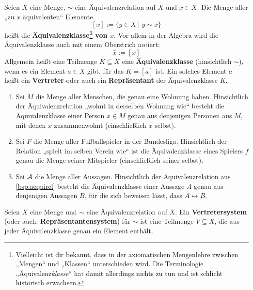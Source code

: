 \begin{defin}[Äquivalenzklasse] \label{def:aequiklasse}   
    Seien $X$ eine Menge, $\sim$ eine Äquivalenzrelation auf $X$ und $x\in X$. Die Menge aller „zu $x$ äquivalenten“ Elemente
        \[ [x] := \{ y\in X \mid y\sim x \}\]
    heißt die \textbf{Äquivalenzklasse\footnote{Vielleicht ist dir bekannt, dass in der axiomatischen Mengenlehre zwischen „Mengen“ und „Klassen“ unterschieden wird. Die Terminologie „Äquivalenz\emph{klasse}“ hat damit allerdings nichts zu tun und ist schlicht historisch erwachsen.} von $x$}. Vor allem in der Algebra wird die Äquivalenzklasse auch mit einem Oberstrich notiert:
        \[ \bar x := [x]\]
    Allgemein heißt eine Teilmenge $K\subseteq X$ eine \textbf{Äquivalenzklasse} (hinsichtlich ${\sim}$), wenn es ein Element $a\in X$ gibt, für das $K=[a]$ ist. Ein solches Element $a$ heißt ein \textbf{Vertreter} oder auch ein \textbf{Repräsentant} der Äquivalenzklasse $K$.
\end{defin}


\begin{bsp} \quad
    \begin{enumerate}
        \item Sei $M$ die Menge aller Menschen, die genau eine Wohnung haben. Hinsichtlich der Äquivalenzrelation „wohnt in derselben Wohnung wie“ besteht die Äquivalenzklasse einer Person $x\in M$ genau aus denjenigen Personen aus $M$, mit denen $x$ zusammenwohnt (einschließlich $x$ selbst).
        \item Sei $F$ die Menge aller Fußballspieler in der Bundesliga. Hinsichtlich der Relation „spielt im selben Verein wie“ ist die Äquivalenzklasse eines Spielers $f$ genau die Menge seiner Mitspieler (einschließlich seiner selbst).
        \item Sei $\mathcal A$ die Menge aller Aussagen. Hinsichtlich der Äquivalenzrelation aus \cref{bsp:aequirel} besteht die Äquivalenzklasse einer Aussage $A$ genau aus denjenigen Aussagen $B$, für die sich beweisen lässt, dass $A\leftrightarrow B$.
    \end{enumerate}
\end{bsp}


\begin{defin}[* Vertretersystem]  
    Seien $X$ eine Menge und ${\sim}$ eine Äquivalenzrelation auf $X$. Ein \textbf{Vertretersystem}  (oder auch: \textbf{Repräsentantensystem}) für ${\sim}$ ist eine Teilmenge $V\subseteq X$, die aus jeder Äquivalenzklasse genau ein Element enthält.
\end{defin}


